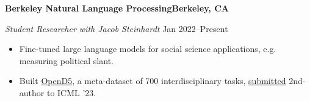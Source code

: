 \textbf{Berkeley Natural Language Processing\hfill Berkeley, CA}\par
\textit{Student Researcher with Jacob Steinhardt} \hfill Jan 2022--Present\par
\begin{itemize}
	\item Fine-tuned large language models for social science applications, e.g. measuring political slant.
	\item Built \href{https://github.com/petezh/OpenD5}{OpenD5}, a meta-dataset of 700 interdisciplinary tasks, \href{https://arxiv.org/abs/2302.14233}{submitted} 2nd-author to ICML '23.
\end{itemize} \par